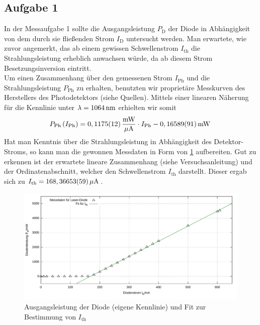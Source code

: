 \documentclass[numbers=noenddot,12pt,a4paper]{scrartcl}
\newcommand{\ix}[1]{_\text{#1}}
\begin{document}
\subsection{Aufgabe 1}
In der Messaufgabe 1 sollte die Ausgangsleistung $P\ix{D}$ der Diode in Abhängigkeit von dem durch sie fließenden Strom $I\ix{D}$ untersucht werden. Man erwartete, wie zuvor angemerkt, das ab einem gewissen Schwellenstrom $I\ix{th}$ die Strahlungsleistung erheblich anwachsen würde, da ab diesem Strom Besetzungsinversion eintritt.\\
Um einen Zusammenhang über den gemessenen Strom $I\ix{Ph}$ und die Strahlungsleistung $P\ix{Ph}$ zu erhalten, benutzten wir proprietäre Messkurven des Herstellers des Photodetektors (siehe Quellen). Mittels einer linearen Näherung für die Kennlinie unter $\lambda=\unit[1064]{nm}$ erhielten wir somit
\begin{align}
	P\ix{Ph}\left(I\ix{Ph}\right)=\unit[0,1175(12)]{\frac{mW}{\mu A}}\cdot I\ix{Ph}-\unit[0,16589(91)]{mW} \,
\end{align}
Hat man Kenntnis über die Strahlungsleistung in Abhängigkeit des Detektor-Stroms, so kann man die gewonnen Messdaten in Form von \ref{img:diodleistung} aufbereiten. Gut zu erkennen ist der erwartete lineare Zusammenhang (siehe Versuchsanleitung) und der Ordinatenabschnitt, welcher den Schwellenstrom $I\ix{th}$ darstellt. Dieser ergab sich zu $I\ix{th}=\unit[168,36653(59)]{\mu A}$.
\begin{figure}[H]
	\centering
	\includegraphics[width=\textwidth]{messwerte/diodenleistung.pdf}
	\caption{Ausgangsleistung der Diode (eigene Kennlinie) und Fit zur Bestimmung von $I\ix{th}$}\label{img:diodleistung}
\end{figure}
\end{document}
